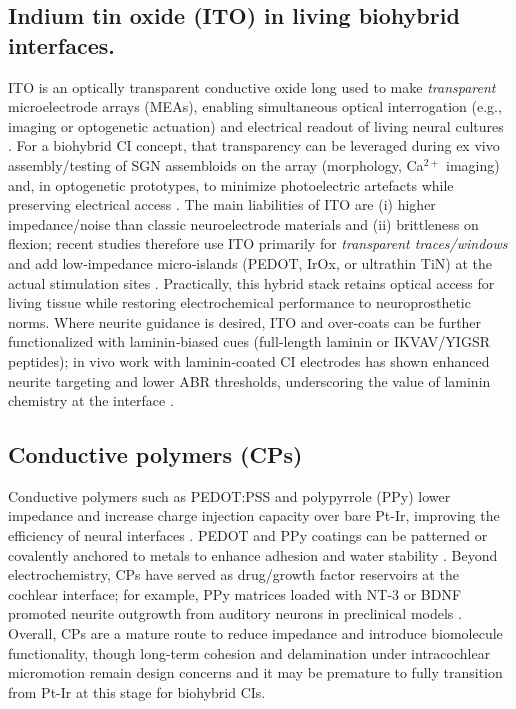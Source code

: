 \documentclass[referee,pdflatex, sn-vancouver-num]{sn-jnl}%
\theoremstyle{thmstyleone}%
\theoremstyle{thmstyletwo}%
\theoremstyle{thmstylethree}%
\begin{document}
\subsection{Indium tin oxide (ITO) in living biohybrid interfaces.}
ITO is an optically transparent conductive oxide long used to make \emph{transparent} microelectrode arrays (MEAs), enabling simultaneous optical interrogation (e.g., imaging or optogenetic actuation) and electrical readout of living neural cultures \citep{Gross1985ITO,Weaver2022TransparentMEA,Kunori2015ITOEpidural}. For a biohybrid CI concept, that transparency can be leveraged during ex vivo assembly/testing of SGN assembloids on the array (morphology, Ca$^{2+}$ imaging) and, in optogenetic prototypes, to minimize photoelectric artefacts while preserving electrical access \citep{Cho2022TransparentImplants}. The main liabilities of ITO are (i) higher impedance/noise than classic neuroelectrode materials and (ii) brittleness on flexion; recent studies therefore use ITO primarily for \emph{transparent traces/windows} and add low‑impedance micro‑islands (PEDOT, IrOx, or ultrathin TiN) at the actual stimulation sites \citep{Ryynanen2019ALDTiN,Ryynanen2020IBAD}. Practically, this hybrid stack retains optical access for living tissue while restoring electrochemical performance to neuroprosthetic norms. Where neurite guidance is desired, ITO and over‑coats can be further functionalized with laminin‑biased cues (full‑length laminin or IKVAV/YIGSR peptides); in vivo work with laminin‑coated CI electrodes has shown enhanced neurite targeting and lower ABR thresholds, underscoring the value of laminin chemistry at the interface \citep{Bas2019LamininCI,Parys2022InnerEarTherapy}.

\subsection{Conductive polymers (CPs)}
Conductive polymers such as PEDOT:PSS and polypyrrole (PPy) lower impedance and increase charge injection capacity over bare Pt-Ir, improving the efficiency of neural interfaces \cite{Venkatraman2011-ql,li2025pedot}. PEDOT and PPy coatings can be patterned or covalently anchored to metals to enhance adhesion and water stability \cite{Kleber2017,Chhin2018}. Beyond electrochemistry, CPs have served as drug/growth factor reservoirs at the cochlear interface; for example, PPy matrices loaded with NT-3 or BDNF promoted neurite outgrowth from auditory neurons in preclinical models \cite{Richardson2007,Richardson2009,Evans2009-cm}. Overall, CPs are a mature route to reduce impedance and introduce biomolecule functionality, though long-term cohesion and delamination under intracochlear micromotion remain design concerns \cite{li2025pedot} and it may be premature to fully transition from Pt-Ir at this stage for biohybrid CIs. 
\end{document}
